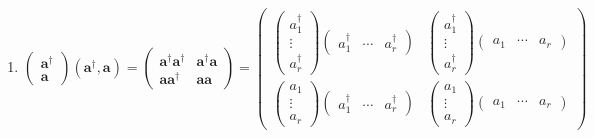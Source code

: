 \documentclass[aps,preprint]{revtex4}
\begin{document}
\begin{enumerate}
\begin{enumerate}
\begin{enumerate}
\item 
\begin{equation}
\left( 
\begin{array}{c}
\mathbf{a}^{\dagger } \\ 
\mathbf{a}%
\end{array}%
\right) \left( \mathbf{a}^{\dagger },\mathbf{a}\right) =\left( 
\begin{array}{cc}
\mathbf{a}^{\dagger }\mathbf{a}^{\dagger } & \mathbf{a}^{\dagger }\mathbf{a}
\\ 
\mathbf{aa}^{\dagger } & \mathbf{aa}%
\end{array}%
\right) =\left( 
\begin{array}{cc}
\left( 
\begin{array}{c}
a_{1}^{\dagger } \\ 
\vdots \\ 
a_{r}^{\dagger }%
\end{array}%
\right) \left( 
\begin{array}{ccc}
a_{1}^{\dagger } & \cdots & a_{r}^{\dagger }%
\end{array}%
\right) & \left( 
\begin{array}{c}
a_{1}^{\dagger } \\ 
\vdots \\ 
a_{r}^{\dagger }%
\end{array}%
\right) \left( 
\begin{array}{ccc}
a_{1} & \cdots & a_{r}%
\end{array}%
\right) \\ 
\left( 
\begin{array}{c}
a_{1} \\ 
\vdots \\ 
a_{r}%
\end{array}%
\right) \left( 
\begin{array}{ccc}
a_{1}^{\dagger } & \cdots & a_{r}^{\dagger }%
\end{array}%
\right) & \left( 
\begin{array}{c}
a_{1} \\ 
\vdots \\ 
a_{r}%
\end{array}%
\right) \left( 
\begin{array}{ccc}
a_{1} & \cdots & a_{r}%
\end{array}%
\right)%
\end{array}%
\right)
\end{equation}


\end{enumerate}
\end{enumerate}
\end{enumerate}
\end{document}
